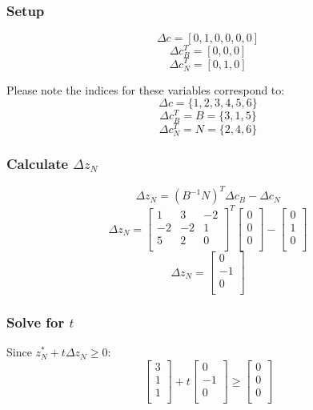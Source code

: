 \documentclass[14pt]{extarticle}
\begin{document}
\subsubsection*{Setup}
\[
    \Delta c = [0, 1, 0, 0, 0, 0]
\]
\[
    \Delta c^T_B = [0, 0, 0]
\]
\[
    \Delta c^T_N = [0, 1, 0]
\]

\bigskip Please note the indices for these variables correspond to:
\[
    \Delta c = \{1, 2, 3, 4, 5, 6\}
\]
\[
    \Delta c^T_B = B = \{3, 1, 5\}
\]
\[
    \Delta c^T_N = N = \{2, 4, 6\}
\]

\subsubsection*{Calculate $\Delta z_N$}
\[
    \Delta z_N = (B^{-1}N)^T \Delta c_B - \Delta c_N
\]
\[
    \Delta z_N = \begin{bmatrix}
        1 & 3 & -2 \\
        -2 & -2 & 1 \\
        5 & 2 & 0 \\
    \end{bmatrix}^T
    \begin{bmatrix}
        0 \\
        0 \\
        0 \\
    \end{bmatrix}
    - \begin{bmatrix}
        0 \\
        1 \\
        0 \\
    \end{bmatrix}
\]
\[
    \Delta z_N = \begin{bmatrix}
        0 \\
        -1 \\
        0 \\
    \end{bmatrix}
\]

\subsubsection*{Solve for $t$}
Since $z^*_N + t\Delta z_N \geq 0$:
\[
    \begin{bmatrix}
        3 \\
        1 \\
        1 \\
    \end{bmatrix}
    + t \begin{bmatrix}
        0 \\
        -1 \\
        0 \\
    \end{bmatrix}
    \geq \begin{bmatrix}
        0 \\
        0 \\
        0 \\
    \end{bmatrix}
\]
\end{document}
